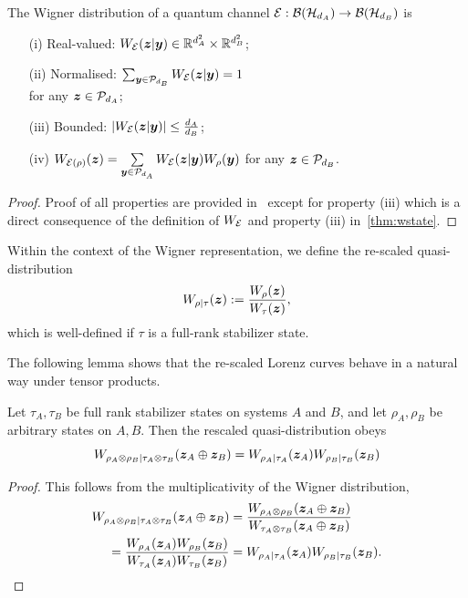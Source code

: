 \documentclass[pra,
aps,
twocolumn,
superscriptaddress,
groupedaddress,
nofootinbib,
reprint
]{revtex4-1}
\begin{document}
\begin{proposition}
    \label{thm:wchannel}
    The Wigner distribution of a quantum channel ${\mathcal E}: \mathcal{B}(\mathcal{H}_{d_A}) \rightarrow \mathcal{B}(\mathcal{H}_{d_B})$ is
    \begin{enumerate}
        \item[(i)]\label{en:wo1} Real-valued: $\W{\E}(\bmz|\bmy) \in \mathbb{R}^{d_A^2} \times \mathbb{R}^{d_B^2}$;
        \item[(ii)]\label{en:wo2} Normalised: $\sum_{\bmy \in \cal{P}_{d_B}} \W[\bmz|\bmy]{\E} = 1$ \\ 
        for any $\bm{z} \in \mathcal{P}_{d_A}$;
        \item[(iii)]\label{en:wo3} Bounded: $\abs{\W[\bmz|\bmy]{\E}} \leq \frac{d_A}{d_B}$;
	    \item[(iv)]\label{en:wo4} $\W[\bmz]{\E(\rho)} = \sum\limits_{\bmy \in \cal{P}_{d_{A}}} \W[\bmz|\bmy]{\E} \W[\bmy]{\rho}$ for any $\bm{z} \in \mathcal{P}_{d_B}$.
    \end{enumerate}
\end{proposition}
\begin{proof}
	Proof of all properties are provided in~\cite{Wang_2019} except for property (iii) which is a direct consequence of the definition of $\W{\E}$ and property (iii) in~\cref{thm:wstate}.
\end{proof}

Within the context of the Wigner representation, we define the re-scaled quasi-distribution
\begin{equation}
	W_{\rho|\tau}(\bm{z}) := \frac{W_\rho (\bm{z}) }{ W_\tau(\bm{z})},
\end{equation}
which is well-defined if $\tau$ is a full-rank stabilizer state.

The following lemma shows that the re-scaled Lorenz curves behave in a natural way under tensor products. 
\begin{proposition}\label{prop:rescaled_multi}
	Let $\tau_A, \tau_B$ be full rank stabilizer states on systems $A$ and $B$, and let $\rho_A, \rho_B$ be arbitrary states on $A,B$. Then the rescaled quasi-distribution obeys
\begin{equation}
W_{\rho_A \otimes \rho_B | \tau_A \otimes \tau_B}(\bm{z}_A \oplus \bm{z}_B) =W_{\rho_A | \tau_A}(\bm{z}_A) W_{\rho_B | \tau_B}(\bm{z}_B)
\end{equation}
\end{proposition}
\begin{proof} This follows from the multiplicativity of the Wigner distribution,
\begin{align}
W_{\rho_A \otimes \rho_B | \tau_A \otimes \tau_B}(\bm{z}_A \oplus \bm{z}_B) &= \frac{W_{\rho_A \otimes \rho_B} (\bm{z}_A \oplus \bm{z}_B)}{W_{\tau_A \otimes \tau_B} (\bm{z}_A \oplus \bm{z}_B)}\nonumber \\
 = \frac{W_{\rho_A } (\bm{z}_A )W_{\rho_B } (\bm{z}_B )}{W_{\tau_A } (\bm{z}_A )W_{\tau_B } (\bm{z}_B )} &= W_{\rho_A | \tau_A}(\bm{z}_A) W_{\rho_B | \tau_B}(\bm{z}_B). \nonumber
\end{align}
\end{proof}
\end{document}
